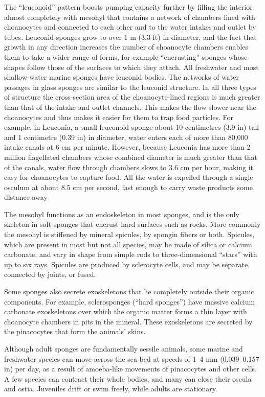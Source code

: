 The ``leuconoid'' pattern boosts pumping capacity further by filling the interior almost completely with mesohyl that contains a network of chambers lined with choanocytes and connected to each other and to the water intakes and outlet by tubes. Leuconid sponges grow to over 1 m (3.3 ft) in diameter, and the fact that growth in any direction increases the number of choanocyte chambers enables them to take a wider range of forms, for example ``encrusting'' sponges whose shapes follow those of the surfaces to which they attach. All freshwater and most shallow-water marine sponges have leuconid bodies. The networks of water passages in glass sponges are similar to the leuconid structure. In all three types of structure the cross-section area of the choanocyte-lined regions is much greater than that of the intake and outlet channels. This makes the flow slower near the choanocytes and thus makes it easier for them to trap food particles. For example, in Leuconia, a small leuconoid sponge about 10 centimetres (3.9 in) tall and 1 centimetre (0.39 in) in diameter, water enters each of more than 80,000 intake canals at 6 cm per minute. However, because Leuconia has more than 2 million flagellated chambers whose combined diameter is much greater than that of the canals, water flow through chambers slows to 3.6 cm per hour, making it easy for choanocytes to capture food. All the water is expelled through a single osculum at about 8.5 cm per second, fast enough to carry waste products some distance away

The mesohyl functions as an endoskeleton in most sponges, and is the only skeleton in soft sponges that encrust hard surfaces such as rocks. More commonly the mesohyl is stiffened by mineral spicules, by spongin fibers or both. Spicules, which are present in most but not all species, may be made of silica or calcium carbonate, and vary in shape from simple rods to three-dimensional ``stars'' with up to six rays. Spicules are produced by sclerocyte cells, and may be separate, connected by joints, or fused.

Some sponges also secrete exoskeletons that lie completely outside their organic components. For example, sclerosponges (``hard sponges'') have massive calcium carbonate exoskeletons over which the organic matter forms a thin layer with choanocyte chambers in pits in the mineral. These exoskeletons are secreted by the pinacocytes that form the animals' skins.

Although adult sponges are fundamentally sessile animals, some marine and freshwater species can move across the sea bed at speeds of 1--4 mm (0.039--0.157 in) per day, as a result of amoeba-like movements of pinacocytes and other cells. A few species can contract their whole bodies, and many can close their oscula and ostia. Juveniles drift or swim freely, while adults are stationary.

